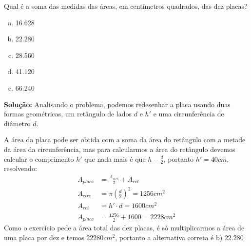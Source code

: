 \begin{multicols*}{2}
    \noindent
    Qual é a soma das medidas das áreas, em centímetros quadrados, das dez placas?
    \begin{enumerate}[a)]
        \item 16.628
        \item 22.280
        \item 28.560
        \item 41.120
        \item 66.240
    \end{enumerate}

    \noindent \textbf{Solução:}
    Analisando o problema, podemos redesenhar a placa usando duas formas
    geométricas, um retângulo de lados $d$ e $h'$ e uma circunferência de 
    diâmetro $d$.
    \begin{figure}[H]
    \centering
    \end{figure}

    \noindent A área da placa pode ser obtida com a soma da área do retângulo 
    com a metade da área da circunferência, mas para calcularmos a área do 
    retângulo devemos calcular o comprimento $h'$ que nada mais é que $h-\frac{d}{2}$, 
    portanto $h' = 40cm$, resolvendo:
    \begin{align}
        A_{placa} &= \frac{A_{circ}}{2} + A_{ret}\\[1ex]
        A_{circ} &= \pi\left( \frac{d}{2} \right)^2 = 1256cm^2\\
        A_{ret} &= h'\cdot d = 1600cm^2 \\
        A_{placa} &= \frac{1256}{2} + 1600 = 2228 cm^2
    \end{align}
    \noindent Como o exercício pede a área total das dez placas, é só 
    multiplicarmos a área de uma placa por dez e temos $22280cm^2$, portanto a 
    alternativa correta é b) 22.280\\


\end{multicols*}
